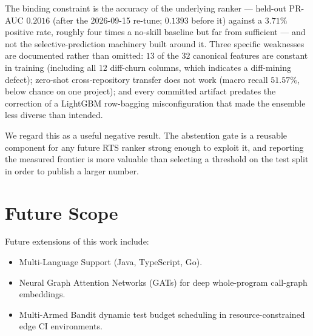 The binding constraint is the accuracy of the underlying ranker --- held-out PR-AUC $0.2016$ (after the
2026-09-15 re-tune; $0.1393$ before it) against a $3.71\%$
positive rate, roughly four times a no-skill baseline but far from sufficient --- and not the
selective-prediction machinery built around it. Three specific weaknesses are documented rather than
omitted: $13$ of the $32$ canonical features are constant in training (including all $12$ diff-churn
columns, which indicates a diff-mining defect); zero-shot cross-repository transfer does not work
(macro recall $51.57\%$, below chance on one project); and every committed artifact predates the
correction of a LightGBM row-bagging misconfiguration that made the ensemble less diverse than intended.

We regard this as a useful negative result. The abstention gate is a reusable component for any future
RTS ranker strong enough to exploit it, and reporting the measured frontier is more valuable than
selecting a threshold on the test split in order to publish a larger number.

\section{Future Scope}
Future extensions of this work include:
\begin{itemize}
    \item Multi-Language Support (Java, TypeScript, Go).
    \item Neural Graph Attention Networks (GATs) for deep whole-program call-graph embeddings.
    \item Multi-Armed Bandit dynamic test budget scheduling in resource-constrained edge CI environments.
\end{itemize}
